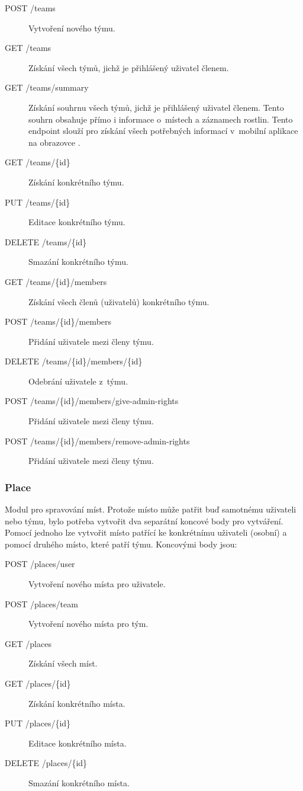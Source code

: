 \documentclass[thesis=M,czech]{FITthesis}[2019/12/23]
\begin{document}
\begin{description}
    \item[POST /teams] Vytvoření nového týmu.
    \item[GET /teams] Získání všech týmů, jichž je přihlášený uživatel členem.
    \item[GET /teams/summary] Získání souhrnu všech týmů, jichž je přihlášený uživatel členem. Tento souhrn obsahuje přímo i informace o~místech a záznamech rostlin. Tento endpoint slouží pro získání všech potřebných informací v~mobilní aplikace na obrazovce .
    \item[GET /teams/\{id\}] Získání konkrétního týmu.
    \item[PUT /teams/\{id\}] Editace konkrétního týmu.
    \item[DELETE /teams/\{id\}] Smazání konkrétního týmu.
    \item[GET /teams/\{id\}/members] Získání všech členů (uživatelů) konkrétního týmu.
    \item[POST /teams/\{id\}/members] Přidání uživatele mezi členy týmu.
    \item[DELETE /teams/\{id\}/members/\{id\}] Odebrání uživatele z~týmu.
    \item[POST /teams/\{id\}/members/give-admin-rights] Přidání uživatele mezi členy týmu.
    \item[POST /teams/\{id\}/members/remove-admin-rights] Přidání uživatele mezi členy týmu.
\end{description}

\subsubsection{Place}
Modul pro spravování míst. Protože místo může patřit buď samotnému uživateli nebo týmu, bylo potřeba vytvořit dva separátní koncové body pro vytváření. Pomocí jednoho lze vytvořit místo patřící ke konkrétnímu uživateli (osobní) a pomocí druhého místo, které patří týmu. Koncovými body jsou:

\begin{description}
    \item[POST /places/user] Vytvoření nového místa pro uživatele.
    \item[POST /places/team] Vytvoření nového místa pro tým.
    \item[GET /places] Získání všech míst.
    \item[GET /places/\{id\}] Získání konkrétního místa.
    \item[PUT /places/\{id\}] Editace konkrétního místa.
    \item[DELETE /places/\{id\}] Smazání konkrétního místa.
\end{description}
\end{document}
